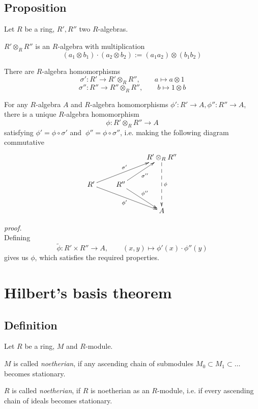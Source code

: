 \documentclass[12pt]{book}
\begin{document}
\begin{spacing}{1.3}
\subsection{Proposition} %
Let $R$ be a ring, $R', R''$ two $R$-algebras. 
\begin{compactenum}
\item $R' \otimes_R R''$ is an $R$-algebra with multiplication
$$(a_1 \otimes b_1) \cdot (a_2 \otimes b_2):= (a_1 a_2) \otimes (b_1 b_2)$$
\item There are $R$-algebra homomorphisms
$$\sigma': R' \longrightarrow R' \otimes_R R'', \qquad a \mapsto a \otimes 1$$
$$\sigma'':R'' \longrightarrow R'' \otimes_R R'', \qquad b \mapsto 1 \otimes b$$
\item For any $R$-algebra $A$ and $R$-algebra homomorphisms $\phi':R' \longrightarrow A, \phi'': R'' \longrightarrow A$, there is a unique $R$-algebra homomorphism
$$\phi: R' \otimes_R R'' \longrightarrow A$$
satisfying $\phi'=\phi \circ \sigma'$ and $\ \phi''=\phi \circ \sigma''$, i.e. making the following diagram commutative
$$\begin{xy}
\xymatrix{
&& R' \otimes_R R'' \ar@{-->}[dd]^{\phi} \\ R' \ar[rru]^{\sigma'} \ar[rrd]_{\phi'} & R'' \ar[ru]_{\sigma''} \ar[rd]^{\phi''} & \\ && A 
}
\end{xy}$$
\end{compactenum}
\textit{proof.}\\
Defining $$\tilde{\phi}: R' \times R'' \longrightarrow A, \qquad (x,y) \mapsto \phi'(x) \cdot \phi''(y)$$
gives us $\phi$, which satisfies the required properties.


\renewcommand*\thesection{\S\ \arabic{section}\quad }
\section{Hilbert's basis theorem}
\renewcommand*\thesection{\arabic{section}}

\subsection{Definition} %
Let $R$ be a ring, $M$ and $R$-module.
\begin{compactenum}
\item $M$ is called \textit{noetherian}, if any ascending chain of submodules $M_0 \subset M_1 \subset \ldots$ becomes stationary.
\item $R$ is called \textit{noetherian}, if $R$ is noetherian as an $R$-module, i.e. if every ascending chain of ideals becomes stationary.
\end{compactenum}


\end{spacing}
\end{document}
